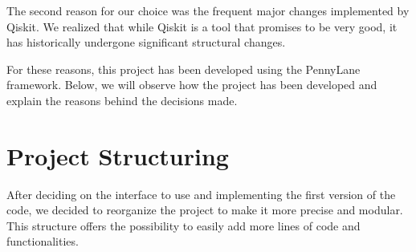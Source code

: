 The second reason for our choice was the frequent major changes implemented by Qiskit. We realized that while Qiskit is a tool that promises to be very good, it has historically undergone significant structural changes.

For these reasons, this project has been developed using the PennyLane framework. Below, we will observe how the project has been developed and explain the reasons behind the decisions made.

\section{Project Structuring}

After deciding on the interface to use and implementing the first version of the code, we decided to reorganize the project to make it more precise and modular. This structure offers the possibility to easily add more lines of code and functionalities.
